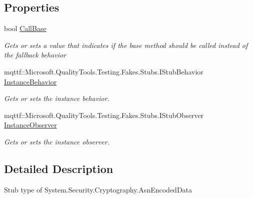 \subsection*{Properties}
\begin{DoxyCompactItemize}
\item 
bool \hyperlink{class_system_1_1_security_1_1_cryptography_1_1_fakes_1_1_stub_asn_encoded_data_a69c42c98569744989cc4826970352406}{Call\-Base}
\begin{DoxyCompactList}\small\item\em Gets or sets a value that indicates if the base method should be called instead of the fallback behavior\end{DoxyCompactList}\item 
mqttf\-::\-Microsoft.\-Quality\-Tools.\-Testing.\-Fakes.\-Stubs.\-I\-Stub\-Behavior \hyperlink{class_system_1_1_security_1_1_cryptography_1_1_fakes_1_1_stub_asn_encoded_data_ad68a850daad1da63309de1cb028576d7}{Instance\-Behavior}
\begin{DoxyCompactList}\small\item\em Gets or sets the instance behavior.\end{DoxyCompactList}\item 
mqttf\-::\-Microsoft.\-Quality\-Tools.\-Testing.\-Fakes.\-Stubs.\-I\-Stub\-Observer \hyperlink{class_system_1_1_security_1_1_cryptography_1_1_fakes_1_1_stub_asn_encoded_data_a96634fe32956fc5a4a3fd34b60156d7c}{Instance\-Observer}
\begin{DoxyCompactList}\small\item\em Gets or sets the instance observer.\end{DoxyCompactList}\end{DoxyCompactItemize}


\subsection{Detailed Description}
Stub type of System.\-Security.\-Cryptography.\-Asn\-Encoded\-Data



